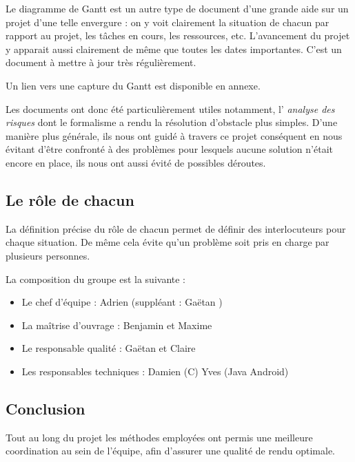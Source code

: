     Le diagramme de Gantt est un autre type de document d'une grande aide sur
    un projet d'une telle envergure : on y voit clairement la situation de
    chacun par rapport au projet, les tâches en cours, les ressources, etc.
    L'avancement du projet y apparait aussi clairement de même que toutes les
    dates importantes. C'est un document à mettre à jour très régulièrement.

    Un lien vers une capture du Gantt est disponible en annexe.

    Les documents ont donc été particulièrement utiles notamment, l'\emph{
    analyse des risques} dont le formalisme a rendu la résolution d'obstacle
    plus simples. D'une manière plus générale, ils nous ont guidé à travers ce
    projet conséquent en nous évitant d'être confronté à des problèmes pour
    lesquels aucune solution n'était encore en place, ils nous ont aussi évité
    de possibles déroutes.

  \subsection{Le rôle de chacun}

    La définition précise du rôle de chacun permet de définir des
    interlocuteurs pour chaque situation. De même cela évite qu'un problème
    soit pris en charge par plusieurs personnes.

    La composition du groupe est la suivante :
    \begin{itemize}
      \item Le chef d'équipe : Adrien  (suppléant : Gaëtan
      )
      \item La maîtrise d'ouvrage : Benjamin  et Maxime 
      \item Le responsable qualité : Gaëtan  et Claire 
      \item Les responsables techniques : Damien  (C) Yves  (Java Android)
    \end{itemize}


  \subsection{Conclusion}

    Tout au long du projet les méthodes employées ont permis une meilleure
    coordination au sein de l'équipe, afin d'assurer une qualité de rendu
    optimale.

